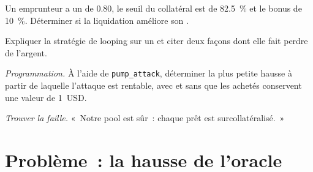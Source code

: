 \begin{exercise}[$\star\star$]\label{exo:m3:defi-credit-and-leverage:5}
Un emprunteur a un  de 0.80, le seuil du collatéral est de 82.5~\% et le bonus de 10~\%. Déterminer si la liquidation améliore son .
\end{exercise}

\begin{exercise}[$\star\star$]\label{exo:m3:defi-credit-and-leverage:6}
Expliquer la stratégie de looping sur un  et citer deux façons dont elle fait perdre de l'argent.
\end{exercise}

\begin{exercise}[$\star\star\star$]\label{exo:m3:defi-credit-and-leverage:7}
\emph{Programmation.} À l'aide de \texttt{pump\_attack}, déterminer la plus petite hausse à partir de laquelle l'attaque est rentable, avec et sans que les  achetés conservent une valeur de 1~USD.
\end{exercise}

\begin{exercise}[$\star\star\star$]\label{exo:m3:defi-credit-and-leverage:8}
\emph{Trouver la faille.} «~Notre pool est sûr~: chaque prêt est surcollatéralisé.~»
\end{exercise}

\section{Problème~: la hausse de l'oracle}

